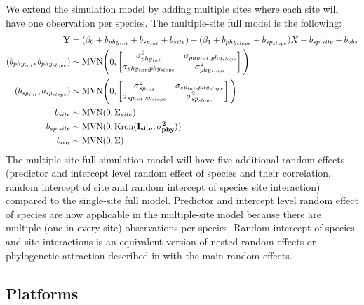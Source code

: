 We extend the simulation model by adding multiple sites where each site will have one observation per species. The multiple-site full model is the following: 
\begin{align}
{\mathbf Y} & = (\beta_0 + b_{phy_{int}} + b_{sp_{int}} + b_{site}) + (\beta_1 + b_{phy_{slope}} + b_{sp_{slope}}) X + b_{sp:site} + b_{obs}\\
(b_{phy_{int}}, b_{phy_{slope}}) & \sim \textrm{MVN} \Bigg( 0, \begin{bmatrix}
\sigma^2_{phy_{int}} & \sigma_{phy_{int},phy_{slope}} \\ 
\sigma_{phy_{int},phy_{slope}} & \sigma^2_{phy_{slope}}
\end{bmatrix}
\Bigg) \\
(b_{sp_{int}}, b_{sp_{slope}}) & \sim \textrm{MVN} \Bigg( 0, \begin{bmatrix}
\sigma^2_{sp_{int}} & \sigma_{sp_{int},phy_{slope}} \\ 
\sigma_{sp_{int},sp_{slope}} & \sigma^2_{sp_{slope}}
\end{bmatrix}
\Bigg) \\
b_{site} & \sim \textrm{MVN} ( 0 , \Sigma_{site}) \\
b_{sp:site} & \sim \textrm{MVN} (0, \textrm{Kron}(\bf{I}_{site}, \sigma^2_{phy})) \\
b_{obs} & \sim \textrm{MVN} ( 0 , \Sigma)
\end{align}
The multiple-site full simulation model will have five additional random effects (predictor and intercept level random effect of species and their correlation, random intercept of site and random intercept of species site interaction) compared to the single-site full model.
Predictor and intercept level random effect of species are now applicable in the multiple-site model because there are multiple (one in every site) observations per species. 
Random intercept of species and site interactions is an equivalent version of nested random effects or phylogenetic attraction described in \cite{helmus2007separating} with the main random effects.

\subsection{Platforms}

